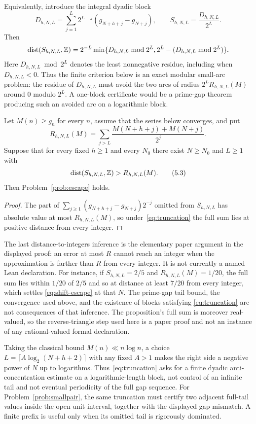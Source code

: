 \documentclass[11pt]{article}
\begin{document}
Equivalently, introduce the integral dyadic block
\[
 D_{h,N,L}=\sum_{j=1}^{L}2^{L-j}
   (g_{N+h+j}-g_{N+j}),\qquad S_{h,N,L}=\frac{D_{h,N,L}}{2^L}.
\]
Then
\[
 \operatorname{dist}(S_{h,N,L},\mathbb{Z})
 =2^{-L}\min\{D_{h,N,L}\bmod2^L,
 2^L-(D_{h,N,L}\bmod2^L)\}.
\]
Here $D_{h,N,L}\bmod2^L$ denotes the least nonnegative residue, including
when $D_{h,N,L}<0$.
Thus the finite criterion below is an exact modular small-arc problem: the
residue of $D_{h,N,L}$ must avoid the two arcs of radius
$2^LR_{h,N,L}(M)$ around $0$ modulo $2^L$.  A one-block certificate would be a
prime-gap theorem producing such an avoided arc on a logarithmic block.

\begin{proposition}\label{res:truncation}
Let $M(n)\ge g_n$ for every $n$, assume that the series below converges, and
put
\[
 R_{h,N,L}(M)=
 \sum_{j>L}\frac{M(N+h+j)+M(N+j)}{2^j}.
\]
Suppose that for every fixed $h\ge1$ and every $N_0$ there exist $N\ge N_0$ and
$L\ge1$ with
\[
 \operatorname{dist}(S_{h,N,L},\Z)>R_{h,N,L}(M).
\tag{5.3}\label{eq:truncation}
\]
Then Problem~\ref{prob:escape} holds.
\end{proposition}

\begin{proof}
The part of $\sum_{j\ge1}(g_{N+h+j}-g_{N+j})2^{-j}$ omitted from $S_{h,N,L}$
has absolute value at most $R_{h,N,L}(M)$, so under~\eqref{eq:truncation} the
full sum lies at positive distance from every integer.
\end{proof}

\noindent The last distance-to-integers inference is the elementary paper
argument in the displayed proof: an error at most $R$ cannot reach an integer
when the approximation is farther than $R$ from every integer.  It is not
currently a named Lean declaration.  For instance, if
$S_{h,N,L}=2/5$ and $R_{h,N,L}(M)=1/20$, the full sum lies within $1/20$ of
$2/5$ and so at distance at least $7/20$ from every integer, which settles
\eqref{eq:shift-escape} at that $N$.  The prime-gap tail
bound, the convergence used above, and the existence of blocks satisfying
\eqref{eq:truncation} are not consequences of that inference.  The
proposition's full sum is moreover real-valued, so the reverse-triangle step
used here is a paper proof and not an instance of any rational-valued formal
declaration.

\noindent Taking the classical bound $M(n)\ll n\log n$, a choice
$L=\lceil A\log_2(N+h+2)\rceil$ with any fixed $A>1$ makes the right side a
negative power of $N$ up to logarithms.  Thus~\eqref{eq:truncation} asks for a finite
dyadic anti-concentration estimate on a logarithmic-length block, not control
of an infinite tail and not eventual periodicity of the full gap sequence.
For Problem~\ref{prob:smallpair}, the same truncation must certify two adjacent
full-tail values inside the open unit interval, together with the displayed
gap mismatch.  A finite prefix is useful only when its omitted tail is
rigorously dominated.
\end{document}
